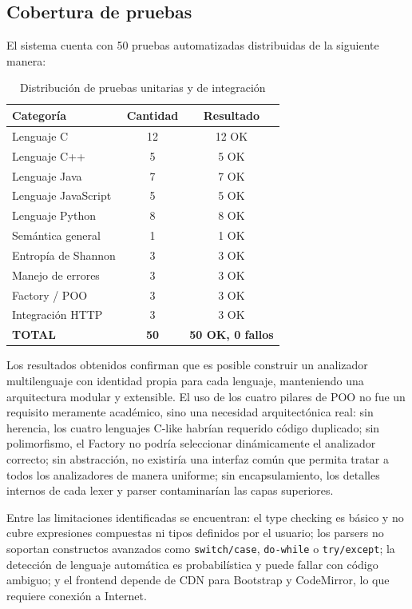 \documentclass[12pt,a4paper]{article}
\begin{document}
\subsection{Cobertura de pruebas}

El sistema cuenta con 50 pruebas automatizadas distribuidas de la siguiente manera:

\begin{table}[H]
\centering
\caption{Distribución de pruebas unitarias y de integración}
\begin{tabular}{@{}lcc@{}}
\toprule
\textbf{Categoría} & \textbf{Cantidad} & \textbf{Resultado} \\
\midrule
Lenguaje C & 12 & 12 OK \\
Lenguaje C++ & 5 & 5 OK \\
Lenguaje Java & 7 & 7 OK \\
Lenguaje JavaScript & 5 & 5 OK \\
Lenguaje Python & 8 & 8 OK \\
Semántica general & 1 & 1 OK \\
Entropía de Shannon & 3 & 3 OK \\
Manejo de errores & 3 & 3 OK \\
Factory / POO & 3 & 3 OK \\
Integración HTTP & 3 & 3 OK \\
\midrule
\textbf{TOTAL} & \textbf{50} & \textbf{50 OK, 0 fallos} \\
\bottomrule
\end{tabular}
\end{table}

Los resultados obtenidos confirman que es posible construir un analizador multilenguaje con identidad propia para cada lenguaje, manteniendo una arquitectura modular y extensible. El uso de los cuatro pilares de POO no fue un requisito meramente académico, sino una necesidad arquitectónica real: sin herencia, los cuatro lenguajes C-like habrían requerido código duplicado; sin polimorfismo, el Factory no podría seleccionar dinámicamente el analizador correcto; sin abstracción, no existiría una interfaz común que permita tratar a todos los analizadores de manera uniforme; sin encapsulamiento, los detalles internos de cada lexer y parser contaminarían las capas superiores.

Entre las limitaciones identificadas se encuentran: el type checking es básico y no cubre expresiones compuestas ni tipos definidos por el usuario; los parsers no soportan constructos avanzados como \texttt{switch/case}, \texttt{do-while} o \texttt{try/except}; la detección de lenguaje automática es probabilística y puede fallar con código ambiguo; y el frontend depende de CDN para Bootstrap y CodeMirror, lo que requiere conexión a Internet.
\end{document}
